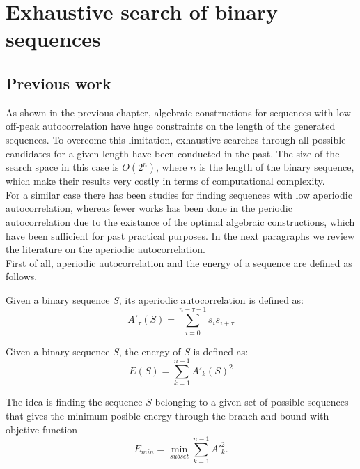 \chapter{Exhaustive search of binary sequences}
  \section{Previous work}

  As shown in the previous chapter, algebraic constructions for sequences
  with  low off-peak autocorrelation have huge constraints on the length of
  the generated sequences. To overcome this limitation, exhaustive searches
  through all possible candidates for a given length have been conducted in the past. The size of the search space in this case is  $O(2^n)$, where $n$ is the length of the binary sequence, which make their
 results very costly in terms of computational complexity.\\

For a similar case there has been studies for finding sequences with low aperiodic autocorrelation, whereas fewer works has been done in the periodic autocorrelation due to the existance of the optimal algebraic constructions, which have been sufficient for past practical purposes. In the next paragraphs  we review the literature on the aperiodic autocorrelation.\\

 First of all, aperiodic autocorrelation  and the energy of a sequence  are defined as follows.\\
  \begin{definition}
      Given a binary sequence $S$, its aperiodic autocorrelation is defined as:
      \begin{equation}
        A'_{\tau}(S) = \sum_{i=0}^{n-\tau-1}s_{i}s_{i+\tau}
      \end{equation}
  \end{definition}

  \begin{definition} Given a binary sequence $S$, the energy of $S$ is defined
    as:
    \begin{equation}
      E(S) = \sum_{k=1}^{n-1} A'_{k}(S)^{2}
    \end{equation}

  \end{definition}
The idea is finding the sequence $S$ belonging to a given set of possible sequences that gives the minimum posible energy through the branch and bound with objetive function
     \begin{equation}
      E_{min} = \operatorname*{min}_{subset} \sum_{k=1}^{n-1} A'^{2}_{k}.
    \end{equation}

